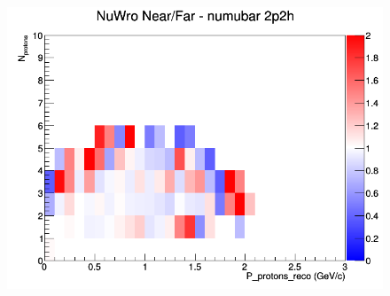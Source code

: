 \begin{figure}[h]
\endminipage
{}
\includegraphics[width=\linewidth]{eff_N_P/LAr/protons/ratios/2p2h_NuWro_numubar_NF_N_P.png}
\endminipage
\newline
\end{figure}
\clearpage
